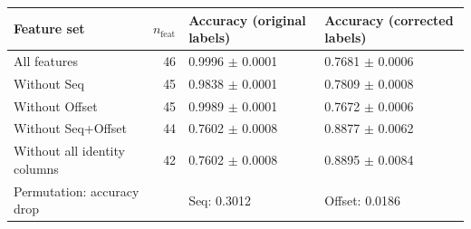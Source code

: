 \begin{tabular}{l r ll}
\toprule
Feature set & $n_{\text{feat}}$ & Accuracy (original labels) & Accuracy (corrected labels)\\
\midrule
All features & 46 & 0.9996 $\pm$ 0.0001 & 0.7681 $\pm$ 0.0006\\
Without Seq & 45 & 0.9838 $\pm$ 0.0001 & 0.7809 $\pm$ 0.0008\\
Without Offset & 45 & 0.9989 $\pm$ 0.0001 & 0.7672 $\pm$ 0.0006\\
Without Seq+Offset & 44 & 0.7602 $\pm$ 0.0008 & 0.8877 $\pm$ 0.0062\\
Without all identity columns & 42 & 0.7602 $\pm$ 0.0008 & 0.8895 $\pm$ 0.0084\\
\midrule
Permutation: accuracy drop &  & Seq: 0.3012 & Offset: 0.0186\\
\bottomrule
\end{tabular}
